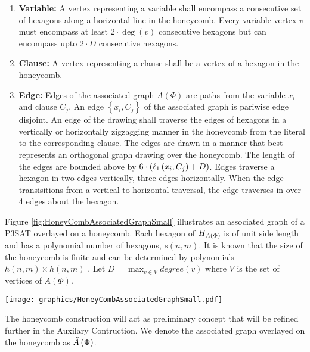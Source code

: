 \begin{enumerate}
\item \textbf{Variable:} A vertex representing a variable shall encompass a consecutive set of hexagons along a horizontal line in the honeycomb. 
Every variable vertex $v$  must encompass at least $2 \cdot \deg(v)$ consecutive hexagons but can encompass upto $2 \cdot D$ consecutive hexagons.
\item \textbf{Clause:} A vertex representing a clause shall be a vertex of a hexagon in the honeycomb.
\item \textbf{Edge:} Edges of the associated graph $A(\Phi)$ are paths from the variable $x_i$ and clause $C_j$.  An edge $\left\lbrace x_i, C_j \right\rbrace$ of the associated graph is pariwise edge disjoint. 
An edge of the drawing shall traverse the edges of hexagons in a vertically or horizontally zigzagging manner in the honeycomb from the literal to the corresponding clause. 
The edges are drawn in a manner that best represents an orthogonal graph drawing over the honeycomb.  
The length of the edges are bounded above by $6 \cdot \left( \ell_1 \left( x_i,C_j \right) + D \right)$. Edges traverse a hexagon in two edges vertically, three edges horizontally.
  When the edge transisitions from a vertical to horizontal traversal, the edge traverses in over 4 edges about the hexagon.
\end{enumerate}
Figure \ref{fig:HoneyCombAssociatedGraphSmall} illustrates an associated graph of a P3SAT overlayed on a honeycomb.
Each hexagon of $H_{A \left( \Phi \right)}$ is of unit side length and has a polynomial number of hexagons, $s(n,m)$.
It is known that the size of the honeycomb is finite and can be determined by polynomials $h(n,m) \times h(n,m)$ \cite{BK+98}.
Let $D = \max_{v \in V} degree(v)$ where $V$ is the set of vertices of $A(\Phi)$.
\begin{minipage}{\linewidth}
\begin{center}
\texttt{[image: graphics/HoneyCombAssociatedGraphSmall.pdf]}
\label{fig:HoneyCombAssociatedGraphSmall}
\end{center}
\end{minipage}

The honeycomb construction will act as preliminary concept that will be refined further in the Auxilary Contruction.
We denote the associated graph overlayed on the honeycomb as $\tilde{A}\left( \Phi \right)$.